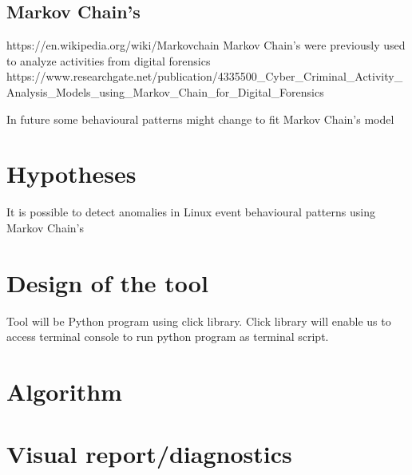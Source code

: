 \documentclass{VUMIFPSmagistrinis}
\begin{document}
    \subsection{Markov Chain's}
        https://en.wikipedia.org/wiki/Markov\textunderscore chain
        Markov Chain's were previously used to analyze activities from digital forensics https://www.researchgate.net/publication/4335500_Cyber_Criminal_Activity_Analysis_Models_using_Markov_Chain_for_Digital_Forensics

        In future some behavioural patterns might change to fit Markov Chain's model

	
\section{Hypotheses}
    It is possible to detect anomalies in Linux event behavioural patterns using Markov Chain's
	
\section{Design of the tool}
    Tool will be Python program using click library. 
    Click library will enable us to access terminal console to run python program as terminal script.
    

\section{Algorithm}


\section{Visual report/diagnostics}


		
\pagebreak
\printbibliography[heading=bibintoc] 
\end{document}
